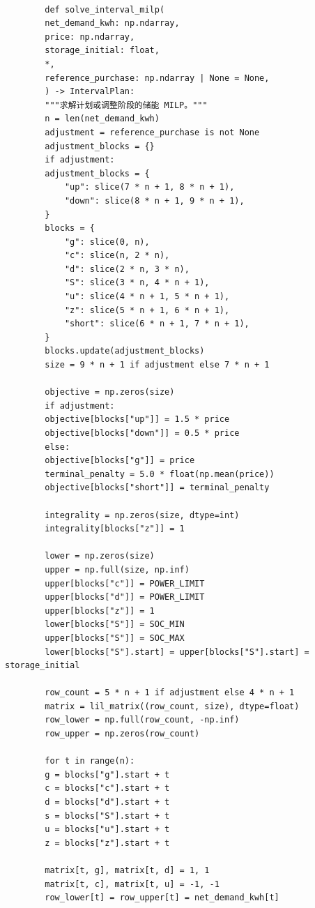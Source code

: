 \documentclass[UTF8]{ctexart}
\begin{document}
\begin{verbatim}
        
        def solve_interval_milp(
        net_demand_kwh: np.ndarray,
        price: np.ndarray,
        storage_initial: float,
        *,
        reference_purchase: np.ndarray | None = None,
        ) -> IntervalPlan:
        """求解计划或调整阶段的储能 MILP。"""
        n = len(net_demand_kwh)
        adjustment = reference_purchase is not None
        adjustment_blocks = {}
        if adjustment:
        adjustment_blocks = {
            "up": slice(7 * n + 1, 8 * n + 1),
            "down": slice(8 * n + 1, 9 * n + 1),
        }
        blocks = {
            "g": slice(0, n),
            "c": slice(n, 2 * n),
            "d": slice(2 * n, 3 * n),
            "S": slice(3 * n, 4 * n + 1),
            "u": slice(4 * n + 1, 5 * n + 1),
            "z": slice(5 * n + 1, 6 * n + 1),
            "short": slice(6 * n + 1, 7 * n + 1),
        }
        blocks.update(adjustment_blocks)
        size = 9 * n + 1 if adjustment else 7 * n + 1
        
        objective = np.zeros(size)
        if adjustment:
        objective[blocks["up"]] = 1.5 * price
        objective[blocks["down"]] = 0.5 * price
        else:
        objective[blocks["g"]] = price
        terminal_penalty = 5.0 * float(np.mean(price))
        objective[blocks["short"]] = terminal_penalty
        
        integrality = np.zeros(size, dtype=int)
        integrality[blocks["z"]] = 1
        
        lower = np.zeros(size)
        upper = np.full(size, np.inf)
        upper[blocks["c"]] = POWER_LIMIT
        upper[blocks["d"]] = POWER_LIMIT
        upper[blocks["z"]] = 1
        lower[blocks["S"]] = SOC_MIN
        upper[blocks["S"]] = SOC_MAX
        lower[blocks["S"].start] = upper[blocks["S"].start] = storage_initial
        
        row_count = 5 * n + 1 if adjustment else 4 * n + 1
        matrix = lil_matrix((row_count, size), dtype=float)
        row_lower = np.full(row_count, -np.inf)
        row_upper = np.zeros(row_count)
        
        for t in range(n):
        g = blocks["g"].start + t
        c = blocks["c"].start + t
        d = blocks["d"].start + t
        s = blocks["S"].start + t
        u = blocks["u"].start + t
        z = blocks["z"].start + t
        
        matrix[t, g], matrix[t, d] = 1, 1
        matrix[t, c], matrix[t, u] = -1, -1
        row_lower[t] = row_upper[t] = net_demand_kwh[t]
        

\end{verbatim}
\end{document}
